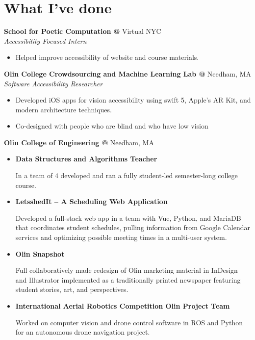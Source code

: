 \documentclass[10pt]{article} %
\begin{document}
\begin{minipage}[t]{0.8\textwidth}
\section*{What I've done}
\textbf{School for Poetic Computation @} \space Virtual NYC \\
\textit{Accessibility Focused Intern}\\
\begin{itemize} [noitemsep,topsep=0pt]
  \item Helped improve accessibility of website and course materials.
  \\
\end{itemize}
\textbf{Olin College Crowdsourcing and Machine Learning Lab @} \space Needham, MA\\
\textit{Software Accessibility Researcher}\\
\begin{itemize} [noitemsep,topsep=0pt]
  \item Developed iOS apps for vision accessibility using swift 5, Apple’s AR Kit, and modern architecture techniques.
  \item Co-designed with people who are blind and who have low vision
  \\
\end{itemize}
\textbf{Olin College of Engineering @} \space Needham, MA\\
\begin{itemize} [noitemsep,topsep=0pt]
  \item {}\textbf{Data Structures and Algorithms Teacher}
  
  In a team of 4 developed and ran a fully student-led semester-long college course.
  \item {}\textbf{LetsshedIt – A Scheduling Web Application}

  Developed a full-stack web app in a team with Vue, Python, and MariaDB that coordinates student schedules, pulling information from Google Calendar services and optimizing possible meeting times in a multi-user system.
  \item {}\textbf{Olin Snapshot }

  Full collaboratively made redesign of Olin marketing material in InDesign and Illustrator implemented as a traditionally printed newspaper featuring student stories, art, and perspectives.
  \item {}\textbf{International Aerial Robotics Competition Olin Project Team}

  Worked on computer vision and drone control software in ROS and Python for an autonomous drone navigation project.
  \\
\end{itemize}
\end{minipage}
\end{document}
